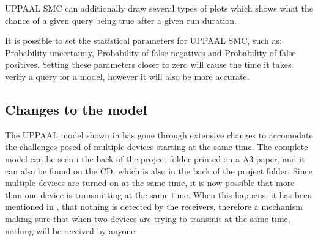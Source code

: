 UPPAAL SMC can additionally draw several types of plots which shows what the chance of a given query being true after a given run duration.

It is possible to set the statistical parameters for UPPAAL SMC, such as: Probability uncertainty, Probability of false negatives and Probability of false positives. 
Setting these parameters closer to zero will cause the time it takes verify a query for a model, however it will also be more accurate. 


\subsection*{Changes to the model}

The UPPAAL model shown in  has gone through extensive changes to accomodate the challenges posed of multiple devices starting at the same time.
The complete model can be seen i the back of the project folder printed on a A3-paper, and it can also be found on the CD, which is also in the back of the project folder.
Since multiple devices are turned on at the same time, it is now possible that more than one device is transmitting at the same time. 
When this happens, it has been mentioned in , that nothing is detected by the receivers, therefore a mechanism making sure that when two devices are trying to transmit at the same time, nothing will be received by anyone.

